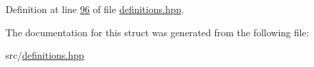 Definition at line \hyperlink{definitions_8hpp_source_l00096}{96} of file \hyperlink{definitions_8hpp_source}{definitions.\+hpp}.



The documentation for this struct was generated from the following file\+:\begin{DoxyCompactItemize}
\item 
src/\hyperlink{definitions_8hpp}{definitions.\+hpp}\end{DoxyCompactItemize}
